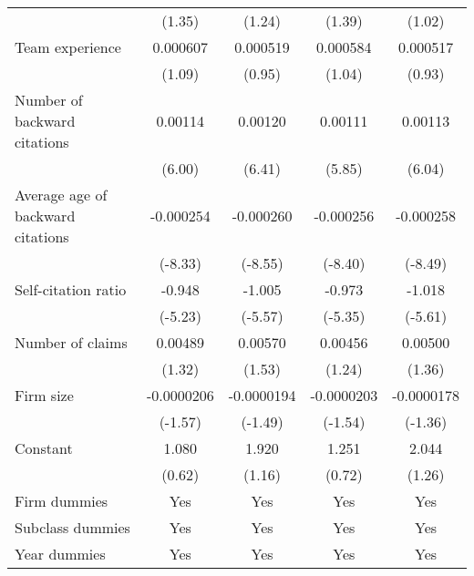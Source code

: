 \begin{table}[htbp]
\begin{tabular}{l*{4}{c}}
                    &      (1.35)         &      (1.24)         &      (1.39)         &      (1.02)         \\
\addlinespace
Team experience     &    0.000607         &    0.000519         &    0.000584         &    0.000517         \\
                    &      (1.09)         &      (0.95)         &      (1.04)         &      (0.93)         \\
\addlinespace
Number of backward citations&     0.00114\sym{***}&     0.00120\sym{***}&     0.00111\sym{***}&     0.00113\sym{***}\\
                    &      (6.00)         &      (6.41)         &      (5.85)         &      (6.04)         \\
\addlinespace
Average age of backward citations&   -0.000254\sym{***}&   -0.000260\sym{***}&   -0.000256\sym{***}&   -0.000258\sym{***}\\
                    &     (-8.33)         &     (-8.55)         &     (-8.40)         &     (-8.49)         \\
\addlinespace
Self-citation ratio &      -0.948\sym{***}&      -1.005\sym{***}&      -0.973\sym{***}&      -1.018\sym{***}\\
                    &     (-5.23)         &     (-5.57)         &     (-5.35)         &     (-5.61)         \\
\addlinespace
Number of claims    &     0.00489         &     0.00570         &     0.00456         &     0.00500         \\
                    &      (1.32)         &      (1.53)         &      (1.24)         &      (1.36)         \\
\addlinespace
Firm size           &  -0.0000206         &  -0.0000194         &  -0.0000203         &  -0.0000178         \\
                    &     (-1.57)         &     (-1.49)         &     (-1.54)         &     (-1.36)         \\
\addlinespace
Constant            &       1.080         &       1.920         &       1.251         &       2.044         \\
                    &      (0.62)         &      (1.16)         &      (0.72)         &      (1.26)         \\
\addlinespace
Firm dummies&Yes&Yes&Yes&Yes\\
\addlinespace
Subclass dummies&Yes&Yes&Yes&Yes\\
\addlinespace
Year dummies&Yes&Yes&Yes&Yes\\

\end{tabular}
\end{table}
